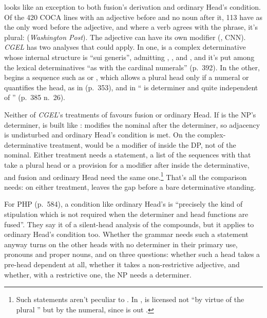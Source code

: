  looks like an exception to both fusion's derivation and ordinary Head's condition. Of the 420 COCA lines with an adjective before  and no noun after it, 113 have  as the only word before the adjective, and where a verb agrees with the phrase, it's plural:  (\textit{Washington Post}). The adjective can have its own modifier (, CNN). \textit{CGEL} has two analyses that could apply. In one,  is a complex determinative whose internal structure is \enquote{sui generis}, admitting , , and , and it's put among the lexical determinatives \enquote{as with the cardinal numerals} (p.~392). In the other,  begins a sequence such as  or , which allows a plural head only if a numeral or  quantifies the head, as in  (p.~353), and in  \enquote{ is determiner and quite independent of } (p.~385 n.~26).

Neither of \textit{CGEL}'s treatments of  favours fusion or ordinary Head. If  is the NP's determiner,  is built like :  modifies the nominal after the determiner, so adjacency is undisturbed and ordinary Head's condition is met. On the complex-determinative treatment,  would be a modifier of  inside the DP, not of the nominal. Either treatment needs a statement, a list of the sequences with  that take a plural head or a provision for a modifier after  inside the determinative, and fusion and ordinary Head need the same one.\footnote{Such statements aren't peculiar to . In ,  is licensed not \enquote{by virtue of the plural } but by the numeral, since  is out \citep[80]{matthews2014}.} That's all the comparison needs: on either treatment,  leaves the gap before a bare determinative standing.

For PHP (p.~584), a condition like ordinary Head's is \enquote{precisely the kind of stipulation which is not required when the determiner and head functions are fused}. They say it of a silent-head analysis of the compounds, but it applies to ordinary Head's condition too. Whether the grammar needs such a statement anyway turns on the other heads with no determiner in their primary use, pronouns and proper nouns, and on three questions: whether such a head takes a pre-head dependent at all, whether it takes a non-restrictive adjective, and whether, with a restrictive one, the NP needs a determiner.

